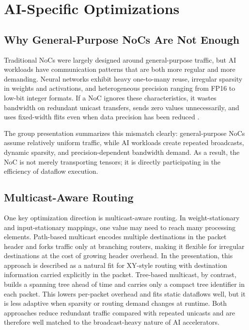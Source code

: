 \section{AI-Specific Optimizations}
\label{sec:aiopt}

\subsection{Why General-Purpose NoCs Are Not Enough}

Traditional NoCs were largely designed around general-purpose traffic, but AI workloads have communication patterns that are both more regular and more demanding. Neural networks exhibit heavy one-to-many reuse, irregular sparsity in weights and activations, and heterogeneous precision ranging from FP16 to low-bit integer formats. If a NoC ignores these characteristics, it wastes bandwidth on redundant unicast transfers, sends zero values unnecessarily, and uses fixed-width flits even when data precision has been reduced \cite{chen2019eyerissv2,zhang2016cambriconx}.

The group presentation summarizes this mismatch clearly: general-purpose NoCs assume relatively uniform traffic, while AI workloads create repeated broadcasts, dynamic sparsity, and precision-dependent bandwidth demand. As a result, the NoC is not merely transporting tensors; it is directly participating in the efficiency of dataflow execution.

\subsection{Multicast-Aware Routing}

One key optimization direction is multicast-aware routing. In weight-stationary and input-stationary mappings, one value may need to reach many processing elements. Path-based multicast encodes multiple destinations in the packet header and forks traffic only at branching routers, making it flexible for irregular destinations at the cost of growing header overhead. In the presentation, this approach is described as a natural fit for XY-style routing with destination information carried explicitly in the packet. Tree-based multicast, by contrast, builds a spanning tree ahead of time and carries only a compact tree identifier in each packet. This lowers per-packet overhead and fits static dataflows well, but it is less adaptive when sparsity or routing demand changes at runtime. Both approaches reduce redundant traffic compared with repeated unicasts and are therefore well matched to the broadcast-heavy nature of AI accelerators.

